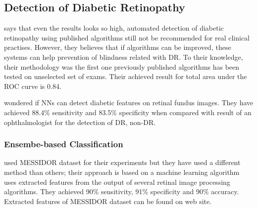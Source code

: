 \subsection{Detection of Diabetic Retinopathy}

\citet{abramoff2008evaluation} says that even the results looks so high, automated detection of diabetic retinopathy using published algorithms still not be recommended for real clinical practises. However, they believes that if algorithms can be improved, these systems can help prevention of blindness related with DR. To their knowledge, their methodology was the first one previously published algorithms has been tested on unselected set of exams. Their achieved result for total area under the ROC curve is 0.84.

\citet{gardner1996automatic} wondered if NNs can detect diabetic features on retinal fundus images. They have achieved 88.4\% sensitivity and 83.5\% specificity when compared with result of an ophthalmologist for the detection of DR, non-DR. 

\subsubsection{Ensembe-based Classification}

\citet{antal2014ensemble} used MESSIDOR dataset for their experiments but they have used a different method than others; their approach is based on a machine learning algorithm uses extracted features from the output of several retinal image processing algorithms. They achieved 90\% sensitivity, 91\% specificity and 90\% accuracy. Extracted features of MESSIDOR dataset can be found on \citet{EnsembleBased} web site. 
